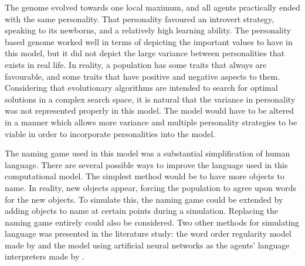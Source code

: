The genome evolved towards one local maximum, and all agents practically ended with the same personality. That personality favoured an introvert strategy, speaking to its newborns, and a relatively high learning ability. The personality based genome worked well in terms of depicting the important values to have in this model, but it did not depict the large variance between personalities that exists in real life. In reality, a population has some traits that always are favourable, and some traits that have positive and negative aspects to them. Considering that evolutionary algorithms are intended to search for optimal solutions in a complex search space, it is natural that the variance in personality was not represented properly in this model. The model would have to be altered in a manner which allows more variance and multiple personality strategies to be viable in order to incorporate personalities into the model.  
 
The naming game used in this model was a substantial simplification of human language. There are several possible ways to improve the language used in this computational model. The simplest method would be to have more objects to name. In reality, new objects appear, forcing the population to agree upon words for the new objects. To simulate this, the naming game could be extended by adding objects to name at certain points during a simulation. Replacing the naming game entirely could also be considered. Two other methods for simulating language was presented in the literature study: the word order regularity model made by \citet{gong2004computational} and the model using artificial neural networks as the agents’ language interpreters made by \citet{munroe2002learning}.